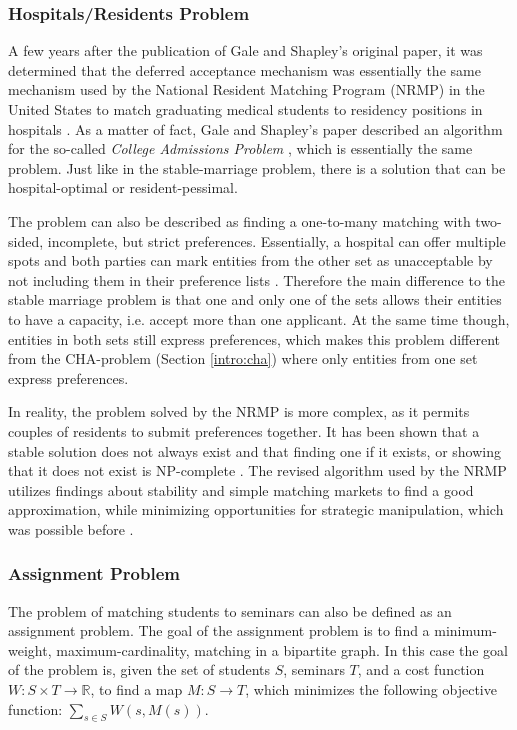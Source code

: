 \subsubsection{Hospitals/Residents Problem}\label{intro:hospital-residents}
A few years after the publication of Gale and Shapley's original paper, it was determined that the deferred acceptance mechanism was essentially the same mechanism used by the National Resident Matching Program (NRMP) in the United States to match graduating medical students to residency positions in hospitals \cite{Gusfield}. As a matter of fact, Gale and Shapley's paper described an algorithm for the so-called \emph{College Admissions Problem} \cite{GaleShapleyOrig}, which is essentially the same problem. Just like in the stable-marriage problem, there is a solution that can be hospital-optimal or resident-pessimal. 

The problem can also be described as finding a one-to-many matching with two-sided, incomplete, but strict preferences. Essentially, a hospital can offer multiple spots and both parties can mark entities from the other set as unacceptable by not including them in their preference lists \cite{RePEc:ris:nobelp:2012_005}. Therefore the main difference to the stable marriage problem is that one and only one of the sets allows their entities to have a capacity, i.e. accept more than one applicant. At the same time though, entities in both sets still express preferences, which makes this problem different from the CHA-problem (Section \ref{intro:cha}) where only entities from one set express preferences.

In reality, the problem solved by the NRMP is more complex, as it permits couples of residents to submit preferences together. It has been shown that a stable solution does not always exist and that finding one if it exists, or showing that it does not exist is NP-complete \cite{RONN1990285}. The revised algorithm used by the NRMP utilizes findings about stability and simple matching markets to find a good approximation, while minimizing opportunities for strategic manipulation, which was possible before \cite{NBERw6963}.

\subsubsection{Assignment Problem}\label{intro_assignment}
The problem of matching students to seminars can also be defined as an assignment problem. The goal of the assignment problem is to find a minimum-weight, maximum-cardinality, matching in a bipartite graph. In this case the goal of the problem is, given the set of students $S$, seminars $T$, and a cost function $W: S \times T \rightarrow \mathbb{R}$, to find a map $M: S \rightarrow T$, which minimizes the following objective function:
$\sum_{s \in S} W(s, M(s))$.

